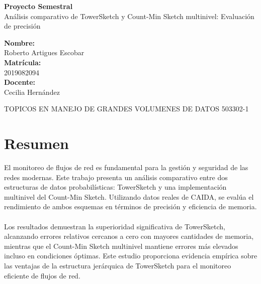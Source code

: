 \documentclass[a4paper,12pt]{article}
\begin{document}
\begin{titlepage}
    \centering
    \vspace*{3cm}
    
    {\Huge \textbf{Proyecto Semestral}}\\[1cm]
    
    {\LARGE Análisis comparativo de TowerSketch y Count-Min Sketch multinivel: Evaluación de precisión}\\[3cm]
    
    \vfill
    \begin{flushright}
        \textbf{Nombre:} \\
        Roberto Artigues Escobar \\[1cm]
        
        \textbf{Matrícula:} \\
        2019082094 \\[1cm]
        
        \textbf{Docente:} \\
        Cecilia Hernández
    \end{flushright}
    
    \vfill
    TOPICOS EN MANEJO DE GRANDES VOLUMENES DE DATOS 503302-1 
\end{titlepage}

\tableofcontents
\newpage

\section{Resumen}
El monitoreo de flujos de red es fundamental para la gestión y seguridad de las redes modernas. Este trabajo presenta un análisis comparativo entre dos estructuras de datos probabilísticas: TowerSketch y una implementación multinivel del Count-Min Sketch.
Utilizando datos reales de CAIDA, se evalúa el rendimiento de ambos esquemas en términos de precisión y eficiencia de memoria. \\ \\ Los resultados demuestran la superioridad significativa de TowerSketch, alcanzando errores relativos cercanos a cero con mayores cantidades 
de memoria, mientras que el Count-Min Sketch multinivel mantiene errores más elevados incluso en condiciones óptimas. Este estudio proporciona evidencia empírica sobre las ventajas de la estructura jerárquica de TowerSketch para el monitoreo eficiente de flujos de red.
\end{document}
